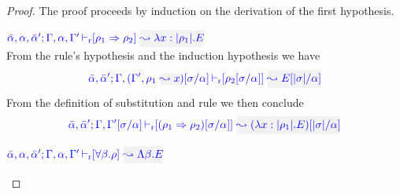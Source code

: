\begin{proof}
The proof proceeds by induction on the derivation of the first hypothesis.
\begin{description}
\setlength{\itemsep}{1em}

\item[\fbox{\rref{R-IAbs}}]\quad$\drres{\bar{\alpha},\alpha,\bar{\alpha}'}{\tenv,\alpha,\tenv'}{\rulet_1 \To \rulet_2}{\abs{\relation{x}{|\rulet_1|}}{E}}$ \\

From the rule's hypothesis and the induction hypothesis we have
\begin{equation*}
\drres{\bar{\alpha},\bar{\alpha}'}{\tenv,(\tenv',\ie{\rulet_1}{x})[\suty/\alpha]}{\rulet_2[\suty/\alpha]}{E[|\suty|/\alpha]}
\end{equation*}
From the definition of substitution and rule  we then conclude
\begin{equation*}
\drres{\bar{\alpha},\bar{\alpha}'}{\tenv,\tenv'[\suty/\alpha]}{(\rulet_1 \iarrow \rulet_2)[\suty/\alpha]}{(\abs{\relation{x}{|\rulet_1|}}{E})[|\suty|/\alpha]}
\end{equation*}

\item[\fbox{\rref{R-TAbs}}]\quad$\drres{\bar{\alpha},\alpha,\bar{\alpha}'}{\tenv,\alpha,\tenv'}{\tall{\beta}{\rulet}}{\Abs{\beta}{E}}$\\


\end{description}
\end{proof}
